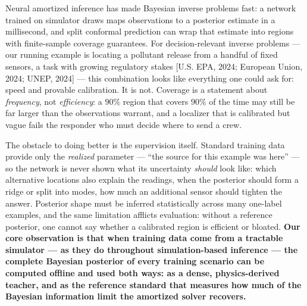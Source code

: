 \documentclass{article}
\begin{document}
Neural amortized inference has made Bayesian inverse problems fast: a network trained on
simulator draws maps observations to a posterior estimate in a millisecond, and split
conformal prediction can wrap that estimate into regions with finite-sample coverage
guarantees. For decision-relevant inverse problems --- our running example is locating a
pollutant release from a handful of fixed sensors, a task with growing regulatory stakes
[U.S. EPA, 2024; European Union, 2024; UNEP, 2024] --- this combination looks like
everything one could ask for: speed and provable calibration. It is not. Coverage is a
statement about \emph{frequency}, not \emph{efficiency}: a $90\%$ region that covers
$90\%$ of the time may still be far larger than the observations warrant, and a localizer
that is calibrated but vague fails the responder who must decide where to send a crew.

The obstacle to doing better is the supervision itself. Standard training data provide
only the \emph{realized} parameter --- ``the source for this example was here'' --- so the
network is never shown what its uncertainty \emph{should} look like: which alternative
locations also explain the readings, when the posterior should form a ridge or split into
modes, how much an additional sensor should tighten the answer. Posterior shape must be
inferred statistically across many one-label examples, and the same limitation afflicts
evaluation: without a reference posterior, one cannot say whether a calibrated region is
efficient or bloated. \textbf{Our core observation is that when training data come from a
tractable simulator --- as they do throughout simulation-based inference --- the complete
Bayesian posterior of every training scenario can be computed offline and used both ways:
as a dense, physics-derived teacher, and as the reference standard that measures how much
of the Bayesian information limit the amortized solver recovers.}
\end{document}
